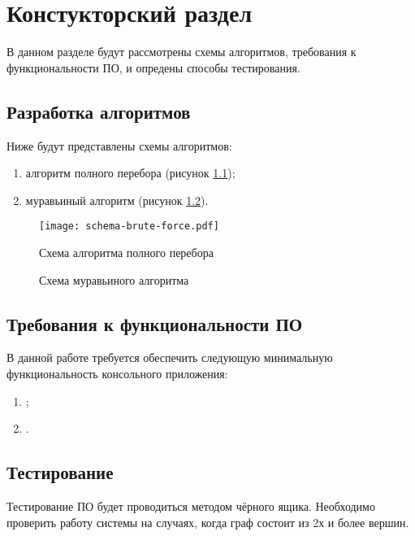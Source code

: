 \chapter{ Констукторский раздел}
\label{cha:design}
    В данном разделе будут рассмотрены схемы алгоритмов, требования к функциональности ПО,
    и опредены способы тестирования.
    
    \section{Разработка алгоритмов}
        Ниже будут представлены схемы алгоритмов: 
        \begin{enumerate}
            \item алгоритм полного перебора (рисунок \ref{schema:brute-force});
            \item муравьиный алгоритм (рисунок \ref{schema:ant}).
        \end{enumerate}

        \begin{figure}[h!]
            \centering
                \texttt{[image: schema-brute-force.pdf]}
                \caption{Схема алгоритма полного перебора}
                \label{schema:brute-force}
        \end{figure}

        \begin{figure}[h!]
            \centering
                \caption{Схема муравьиного алгоритма}
                \label{schema:ant}
        \end{figure}

    \section{Требования к функциональности ПО}
        В данной работе требуется обеспечить следующую минимальную функциональность консольного приложения:
        \begin{enumerate}
            \item ;
            \item .
        \end{enumerate}

    \section{Тестирование}
        Тестирование ПО будет проводиться методом чёрного ящика. 
        Необходимо проверить работу системы на случаях,
        когда граф состоит из 2х и более вершин.

\newpage